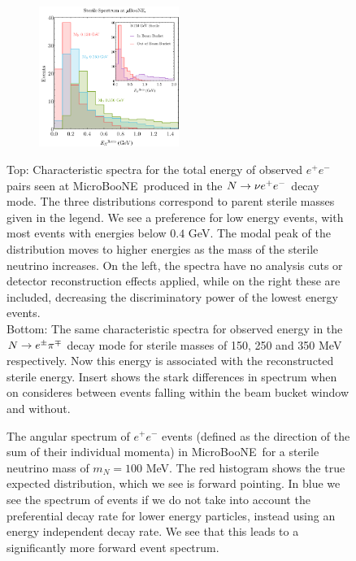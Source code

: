 \documentclass[11pt, a4paper]{article}
\def\muboone{MicroBooNE}
\def\ster{\ensuremath N}
\begin{document}
\begin{figure}[t]
%

\begin{subfigure}[t]{\textwidth}
\center
%
\large

\resizebox{\columnwidth}{!}{}
%
%
\end{subfigure}
~\\
\begin{subfigure}[t]{\textwidth}
	\center
\includegraphics[width=0.5\textwidth]{figures/sterilecomparason.pdf}
\end{subfigure}

\caption{\label{fig:spectrum_ee} Top: Characteristic spectra for the total energy of observed  $e^+e^-$ pairs seen at \muboone\ produced in the $\ster \to \nu e^+e^-$ decay mode. The three distributions correspond to parent sterile masses given in the legend. We see a preference for low energy events, with most events with energies below $0.4$ GeV. The modal peak of the distribution moves to higher energies as the mass of the sterile neutrino increases. On the left, the spectra have no analysis cuts or detector reconstruction effects applied, while on the right these are included, decreasing the discriminatory power of the lowest energy events.\\
Bottom: The same characteristic spectra for observed energy in the  $\ster\rightarrow e^\pm \pi^\mp$ decay mode for sterile masses of 150,
250 and 350 MeV respectively. Now this energy is associated with the reconstructed sterile energy. Insert shows the stark differences in spectrum when on consideres between events falling
within the beam bucket window and without.}
\end{figure}




\begin{figure}[t]
%
\center
%
\Large

\resizebox{0.8\columnwidth}{!}{}
%
\caption{\label{fig:spectrum_ee_angular} The angular spectrum of $e^+e^-$
events (defined as the direction of the sum of their individual momenta) in
\muboone\ for a sterile neutrino mass of $m_N = 100$ MeV. The red histogram
shows the true expected distribution, which we see is forward pointing. In blue
we see the spectrum of events if we do not take into account the preferential
decay rate for lower energy particles, instead using an energy independent
decay rate. We see that this leads to a significantly more forward event 
spectrum.}
%
\end{figure}
\end{document}
